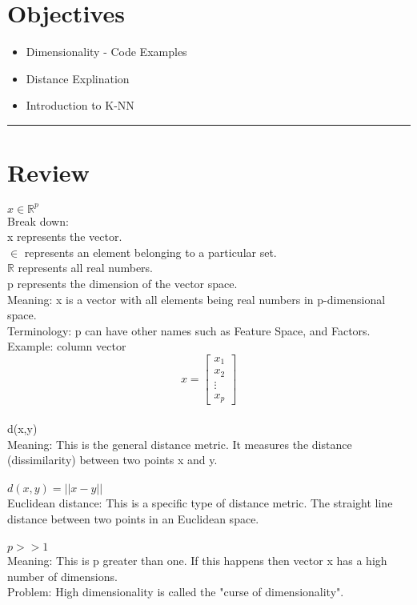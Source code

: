 \section*{Objectives}
\begin{itemize}
  \item Dimensionality - Code Examples
  \item Distance Explination
  \item Introduction to K-NN
  \end{itemize}

\rule[0.0051in]{\textwidth}{0.00025in}

\section{Review}
$x \in {\mathbb{R}}^p$ \\
Break down: \\
\hspace*{1cm} x represents the vector. \\
\hspace*{1cm} $\in$ represents an element belonging to a particular set. \\
\hspace*{1cm} $\mathbb{R}$ represents all real numbers. \\
\hspace*{1cm} p represents the dimension of the vector space. \\
Meaning: x is a vector with all elements being real numbers in p-dimensional space. \\
Terminology: p can have other names such as Feature Space, and Factors. \\
Example: column vector\\
\[
x= \begin{bmatrix}
x_1 \\
x_2 \\
\vdots \\
x_p
\end{bmatrix}
\] \\
d(x,y) \\
Meaning: This is the general distance metric. It measures the distance (dissimilarity) between two points x and y. \\\\
$d(x,y) = ||x-y||$ \\
Euclidean distance: This is a specific type of distance metric. The straight line distance between two points in an Euclidean space. \\\\
$p>>1$ \\ 
Meaning: This is p  greater than one. If this happens then vector x has a high number of dimensions. \\
Problem: High dimensionality is called the "curse of dimensionality". \\\\

